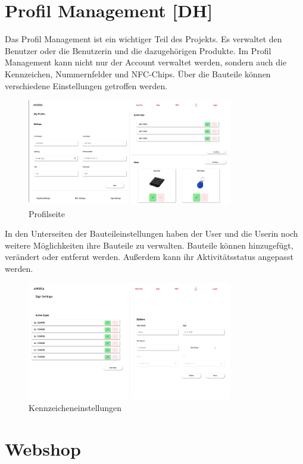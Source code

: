 \section{Profil Management [DH]}
Das Profil Management ist ein wichtiger Teil des Projekts. Es verwaltet den Benutzer oder die Benutzerin und die dazugehörigen Produkte. Im Profil Management kann nicht nur der Account verwaltet werden, sondern auch die Kennzeichen, Nummernfelder und NFC-Chips. Über die Bauteile können verschiedene Einstellungen getroffen werden.

\begin{figure}
    \centering
    \includegraphics[width=0.8\textwidth]{pics/Profil_Management.png}
    \caption{Profilseite}
\end{figure}

In den Unterseiten der Bauteileinstellungen haben der User und die Userin noch weitere Möglichkeiten ihre Bauteile zu verwalten. Bauteile können hinzugefügt, verändert oder entfernt werden. Außerdem kann ihr Aktivitätsstatus angepasst werden. 

\begin{figure}
    \centering
    \includegraphics[width=0.8\textwidth]{pics/Kennzeichen_Einstellungen.png}
    \caption{Kennzeicheneinstellungen}
\end{figure}


\section{Webshop}
